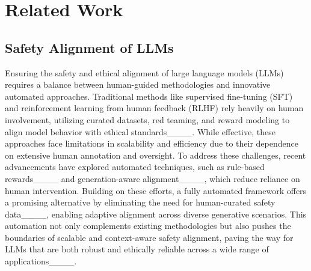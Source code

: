 \section{Related Work}

\subsection{Safety Alignment of LLMs} 
Ensuring the safety and ethical alignment of large language models (LLMs) requires a balance between human-guided methodologies and innovative automated approaches. Traditional methods like supervised fine-tuning (SFT) and reinforcement learning from human feedback (RLHF) rely heavily on human involvement, utilizing curated datasets, red teaming, and reward modeling to align model behavior with ethical standards____. While effective, these approaches face limitations in scalability and efficiency due to their dependence on extensive human annotation and oversight. To address these challenges, recent advancements have explored automated techniques, such as rule-based rewards____ and generation-aware alignment____, which reduce reliance on human intervention. Building on these efforts, a fully automated framework offers a promising alternative by eliminating the need for human-curated safety data____, enabling adaptive alignment across diverse generative scenarios. This automation not only complements existing methodologies but also pushes the boundaries of scalable and context-aware safety alignment, paving the way for LLMs that are both robust and ethically reliable across a wide range of applications____.

